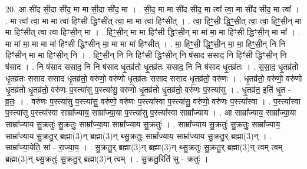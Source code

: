 \documentclass[17pt]{extarticle}
\begin{document}
20. आ सी॑द सी॒दा सी॑द॒ मा मा सी॒दा सी॑द॒ मा । . सी॒द॒ मा मा सी॑द सीद॒ मा त्वा᳚ त्वा॒ मा सी॑द सीद॒ मा त्वा᳚ । . मा त्वा᳚ त्वा॒ मा मा त्वा॑ हिꣳसी द्धिꣳसीत् त्वा॒ मा मा त्वा॑ हिꣳसीत् । . त्वा॒ हिꣳ॒॒सी॒ द्धिꣳ॒॒सी॒त् त्वा॒ त्वा॒ हिꣳ॒॒सी॒न् मा मा हिꣳ॑सीत् त्वा त्वा हिꣳसी॒न् मा । . हिꣳ॒॒सी॒न् मा मा हिꣳ॑सी द्धिꣳसी॒न् मा मा॑ मा॒ मा हिꣳ॑सी द्धिꣳसी॒न् मा मा᳚ । . मा मा॑ मा॒ मा मा मा॑ हिꣳसी द्धिꣳसीन् मा॒ मा मा मा॑ हिꣳसीत् । . मा॒ हिꣳ॒॒सी॒ द्धिꣳ॒॒सी॒न् मा॒ मा॒ हिꣳ॒॒सी॒न् नि नि हिꣳ॑सीन् मा मा हिꣳसी॒न् नि । . हिꣳ॒॒सी॒न् नि नि हिꣳ॑सी द्धिꣳसी॒न् नि ष॑साद ससाद॒ नि हिꣳ॑सी द्धिꣳसी॒न् नि ष॑साद । . नि ष॑साद ससाद॒ नि नि ष॑साद धृ॒तव्र॑तो धृ॒तव्र॑तः ससाद॒ नि नि ष॑साद धृ॒तव्र॑तः । . स॒सा॒द॒ धृ॒तव्र॑तो धृ॒तव्र॑तः ससाद ससाद धृ॒तव्र॑तो॒ वरु॑णो॒ वरु॑णो धृ॒तव्र॑तः ससाद ससाद धृ॒तव्र॑तो॒ वरु॑णः । . धृ॒तव्र॑तो॒ वरु॑णो॒ वरु॑णो धृ॒तव्र॑तो धृ॒तव्र॑तो॒ वरु॑णः प॒स्त्या॑सु प॒स्त्या॑सु॒ वरु॑णो धृ॒तव्र॑तो धृ॒तव्र॑तो॒ वरु॑णः प॒स्त्या॑सु । . धृ॒तव्र॑त॒ इति॑ धृ॒त - व्र॒तः॒ । . वरु॑णः प॒स्त्या॑सु प॒स्त्या॑सु॒ वरु॑णो॒ वरु॑णः प॒स्त्या᳚स्वा प॒स्त्या॑सु॒ वरु॑णो॒ वरु॑णः प॒स्त्या᳚स्वा । . प॒स्त्या᳚स्वा प॒स्त्या॑सु प॒स्त्या᳚स्वा साम्रा᳚ज्याय॒ साम्रा᳚ज्या॒या प॒स्त्या॑सु प॒स्त्या᳚स्वा साम्रा᳚ज्याय । . आ साम्रा᳚ज्याय॒ साम्रा᳚ज्या॒या साम्रा᳚ज्याय सु॒क्रतुः॑ सु॒क्रतुः॒ साम्रा᳚ज्या॒या साम्रा᳚ज्याय सु॒क्रतुः॑ । . साम्रा᳚ज्याय सु॒क्रतुः॑ सु॒क्रतुः॒ साम्रा᳚ज्याय॒ साम्रा᳚ज्याय सु॒क्रतु॒र् ब्रह्मा(3)न् ब्रह्मा(3)न् थ्सु॒क्रतुः॒ साम्रा᳚ज्याय॒ साम्रा᳚ज्याय सु॒क्रतु॒र् ब्रह्मा(3)न् । . साम्रा᳚ज्या॒येति॒ सां - रा॒ज्या॒य॒ । . सु॒क्रतु॒र् ब्रह्मा(3)न् ब्रह्मा(3)न् थ्सु॒क्रतुः॑ सु॒क्रतु॒र् ब्रह्मा(3)न् त्वम् त्वम् ब्रह्मा(3)न् थ्सु॒क्रतुः॑ सु॒क्रतु॒र् ब्रह्मा(3)न् त्वम् । . सु॒क्रतु॒रिति॑ सु - क्रतुः॑ । \newline
\end{document}
